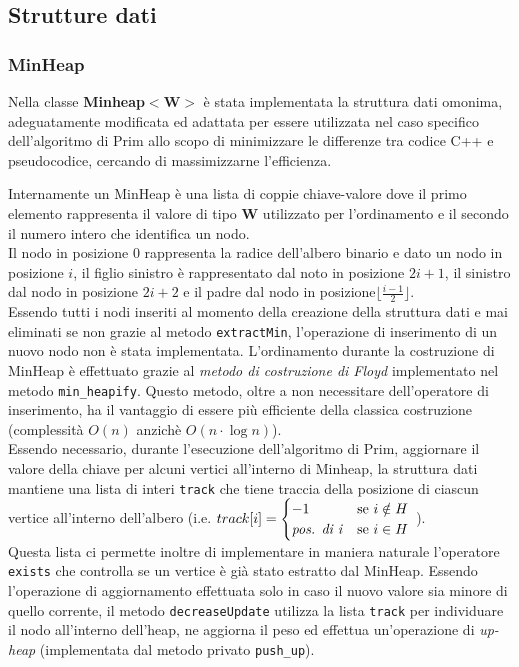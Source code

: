 \documentclass[]{article}
\begin{document}
\subsection{Strutture dati}
\subsubsection{MinHeap}
Nella classe \textbf{Minheap$<$W$>$} è stata implementata la struttura dati omonima, adeguatamente modificata ed adattata per essere utilizzata nel caso specifico dell'algoritmo di Prim allo scopo di minimizzare le differenze tra codice C++ e pseudocodice, cercando di massimizzarne l'efficienza.\smallskip
\begin{flushleft}
Internamente un MinHeap è una lista di coppie chiave-valore dove il primo elemento rappresenta il valore di tipo \textbf{W} utilizzato per l'ordinamento e il secondo il numero intero che identifica un nodo.\\
Il nodo in posizione 0 rappresenta la radice dell'albero binario e dato un nodo in posizione $i$, il figlio sinistro è rappresentato dal noto in posizione $2i+1$, il sinistro dal nodo in posizione $2i+2$ e il padre dal nodo in posizione$\lfloor \frac{i-1}{2}\rfloor$.\\
Essendo tutti i nodi inseriti al momento della creazione della struttura dati e mai eliminati se non grazie al metodo \verb|extractMin|, l'operazione di inserimento di un nuovo nodo non è stata implementata.
L'ordinamento durante la costruzione di MinHeap è effettuato grazie al \textit{metodo di costruzione di Floyd} implementato nel metodo \verb|min_heapify|. Questo metodo, oltre a non necessitare dell'operatore di inserimento, ha il vantaggio di essere più efficiente della classica costruzione (complessità $O(n)$ anzichè $O(n\cdot\log n)$).\\\smallskip
Essendo necessario, durante l'esecuzione dell'algoritmo di Prim, aggiornare il valore della chiave per alcuni vertici all'interno di Minheap, la struttura dati mantiene una lista di interi \verb|track| che tiene traccia della posizione di ciascun vertice all'interno dell'albero (i.e. $track[i]=\begin{cases}
-1 & \text{se } i \notin H\\
\text{\textit{pos. di i}} & \text{se } i \in H\\
\end{cases}$ ).\\
Questa lista ci permette inoltre di implementare in maniera naturale l'operatore \verb|exists| che controlla se un vertice è già stato estratto dal MinHeap.
Essendo l'operazione di aggiornamento effettuata solo in caso il nuovo valore sia minore di quello corrente, il metodo \verb|decreaseUpdate| utilizza la lista \verb|track| per individuare il nodo all'interno dell'heap, ne aggiorna il peso ed effettua un'operazione di \textit{up-heap} (implementata dal metodo privato \verb|push_up|).
\end{flushleft}
\end{document}
